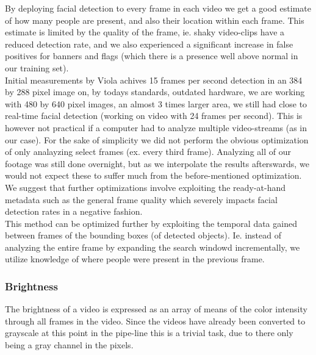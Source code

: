 By deploying facial detection to every frame in each video we get a good estimate of how many people are present, and also their location within each frame. This estimate is limited by the quality of the frame, ie. shaky video-clips have a reduced detection rate, and we also experienced a significant increase in false positives for banners and flags (which there is a presence well above normal in our training set).\\
Initial measurements by Viola achives 15 frames per second detection in an 384 by 288 pixel image on, by todays standards, outdated hardware, we are working with 480 by 640 pixel images, an almost 3 times larger area, we still had close to real-time facial detection (working on video with 24 frames per second). This is however not practical if a computer had to analyze multiple video-streams (as in our case). For the sake of simplicity we did not perform the obvious optimization of only analayzing select frames (ex. every third frame). Analyzing all of our footage was still done overnight, but as we interpolate the results afterswards, we would not expect these to suffer much from the before-mentioned optimization.\\
We suggest that further optimizations involve exploiting the ready-at-hand metadata such as the general frame quality which severely impacts facial detection rates in a negative fashion.\\
This method can be optimized further by exploiting the temporal data gained between frames of the bounding boxes (of detected objects). Ie. instead of analyzing the entire frame by expanding the search windowd incrementally, we utilize knowledge of where people were present in the previous frame.
%
\subsubsection{Brightness}
%
The brightness of a video is expressed as an array of means
%
%
of the color intensity through all frames in the video. Since the videos have already been converted to grayscale at this point in the pipe-line this is a trivial task, due to there only being a gray channel in the pixels.
%
